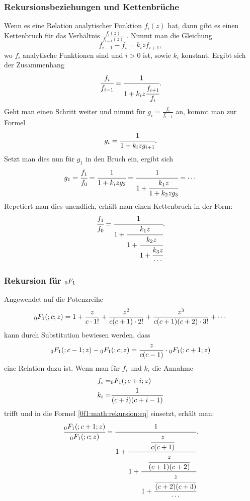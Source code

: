 \subsubsection{Rekursionsbeziehungen und Kettenbrüche}
Wenn es eine Relation analytischer Funktion $f_i(z)$ hat, dann gibt es einen Kettenbruch für das Verhältnis $\frac{f_i(z)}{f_{i-1}(z)}$ \cite{0f1:wiki-fraction}. 
Nimmt man die Gleichung
\begin{equation*}
	f_{i-1} - f_i = k_i z f_{i+1},
\end{equation*}
wo $f_i$ analytische Funktionen sind und $i > 0$ ist, sowie $k_i$ konstant.
Ergibt sich der Zusammenhang
\begin{equation*}
	\cfrac{f_i}{f_{i-1}} = \cfrac{1}{1+k_iz\cfrac{f_{i+1}}{f_i}}.
\end{equation*}
Geht man einen Schritt weiter und nimmt für $g_i = \frac{f_i}{f_{i-1}}$ an, kommt man zur Formel
\begin{equation*}
	g_i = \cfrac{1}{1+k_izg_{i+1}}.
\end{equation*}
Setzt man dies nun für $g_1$ in den Bruch ein, ergibt sich
\begin{equation*}
	g_1 = \cfrac{f_1}{f_0} = \cfrac{1}{1+k_izg_2} = \cfrac{1}{1+\cfrac{k_1z}{1+k_2zg_3}} = \cdots
\end{equation*}
Repetiert man dies unendlich, erhält man einen Kettenbruch in der Form:
\begin{equation}
	\label{0f1:math:rekursion:eq}
	\cfrac{f_1}{f_0} = \cfrac{1}{1+\cfrac{k_1z}{1+\cfrac{k_2z}{1+\cfrac{k_3z}{\cdots}}}}.
\end{equation}

\subsubsection{Rekursion für $\mathstrut_0F_1$}
Angewendet auf die Potenzreihe
\begin{equation}
	\label{0f1:math:potenzreihe:0f1:eq}
	\mathstrut_0F_1(;c;z) = 1 + \frac{z}{c\cdot1!} + \frac{z^2}{c(c+1)\cdot2!} + \frac{z^3}{c(c+1)(c+2)\cdot3!} + \cdots
\end{equation}
kann durch Substitution bewiesen werden, dass
\begin{equation*}
	\mathstrut_0F_1(;c-1;z) - \mathstrut_0F_1(;c;z) = \frac{z}{c(c-1)} \cdot \mathstrut_0F_1(;c+1;z)
\end{equation*}
eine Relation dazu ist.
Wenn man für $f_i$ und $k_i$ die Annahme
\begin{align*}
	f_i =& \mathstrut_0F_1(;c+i;z)\\
	k_i	=& \frac{1}{(c+i)(c+i-1)}
\end{align*}
trifft und in die Formel \eqref{0f1:math:rekursion:eq} einsetzt, erhält man:
\begin{equation*}
	\cfrac{\mathstrut_0F_1(;c+1;z)}{\mathstrut_0F_1(;c;z)} = \cfrac{1}{1+\cfrac{\cfrac{z}{c(c+1)}}{1+\cfrac{\cfrac{z}{(c+1)(c+2)}}{1+\cfrac{\cfrac{z}{(c+2)(c+3)}}{\cdots}}}}.
\end{equation*}

